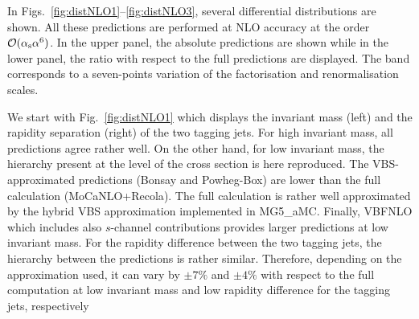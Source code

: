 In Figs.~\ref{fig:distNLO1}--\ref{fig:distNLO3}, several differential distributions are shown.
All these predictions are performed at NLO accuracy at the order $\mathcal{O}(\alpha_\text{s}\alpha^6)$.
In the upper panel, the absolute predictions are shown while in the lower panel, the ratio with respect to the full predictions are displayed.
The band corresponds to a seven-points variation of the factorisation and renormalisation scales.

We start with Fig.~\ref{fig:distNLO1} which displays the invariant mass (left) and the rapidity separation (right) of the two tagging jets.
For high invariant mass, all predictions agree rather well.
On the other hand, for low invariant mass, the hierarchy present at the level of the cross section is here reproduced.
The VBS-approximated predictions ({\sc Bonsay} and {\sc Powheg-Box}) are lower than the full calculation ({\sc MoCaNLO}+{\sc Recola}).
The full calculation is rather well approximated by the hybrid VBS approximation implemented in {\sc MG5\_aMC}.
Finally, {\sc VBFNLO} which includes also $s$-channel contributions provides larger predictions at low invariant mass.
For the rapidity difference between the two tagging jets, the hierarchy between the predictions is rather similar.
Therefore, depending on the approximation used, it can vary by $\pm7\%$ and $\pm4\%$ with respect to the full computation at low invariant mass and low rapidity difference for the tagging jets, respectively

